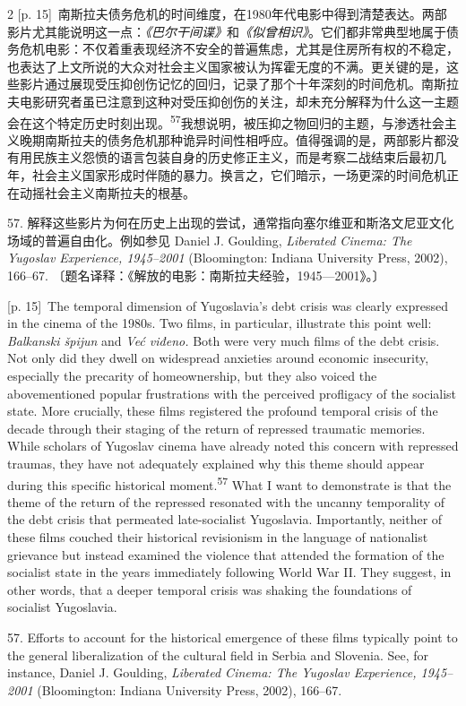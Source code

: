\documentclass[10pt,a4paper]{article}
\begin{document}
\begin{paracol}{2}
{\scriptsize\color{gray} [p. 15]}\ 南斯拉夫债务危机的时间维度，在1980年代电影中得到清楚表达。两部影片尤其能说明这一点：\textit{《巴尔干间谍》}和\textit{《似曾相识》}。它们都非常典型地属于债务危机电影：不仅着重表现经济不安全的普遍焦虑，尤其是住房所有权的不稳定，也表达了上文所说的大众对社会主义国家被认为挥霍无度的不满。更关键的是，这些影片通过展现受压抑创伤记忆的回归，记录了那个十年深刻的时间危机。南斯拉夫电影研究者虽已注意到这种对受压抑创伤的关注，却未充分解释为什么这一主题会在这个特定历史时刻出\mbox{现。\textsuperscript{57}}我想说明，被压抑之物回归的主题，与渗透社会主义晚期南斯拉夫的债务危机那种诡异时间性相呼应。值得强调的是，两部影片都没有用民族主义怨愤的语言包装自身的历史修正主义，而是考察二战结束后最初几年，社会主义国家形成时伴随的暴力。换言之，它们暗示，一场更深的时间危机正在动摇社会主义南斯拉夫的根基。\par{\small 57. 解释这些影片为何在历史上出现的尝试，通常指向塞尔维亚和斯洛文尼亚文化场域的普遍自由化。例如参见 Daniel J. Goulding, \textit{Liberated Cinema: The Yugoslav Experience, 1945–2001} (Bloomington: Indiana University Press, 2002), 166–67. 〔题名译释：《解放的电影：南斯拉夫经验，1945—2001》。〕\par}
\switchcolumn
{\scriptsize\color{gray} [p. 15]}\ The temporal dimension of Yugoslavia’s debt crisis was clearly expressed in the cinema of the 1980s. Two films, in particular, illustrate this point well: \textit{Balkanski špijun} and \textit{Već viđeno.} Both were very much films of the debt crisis. Not only did they dwell on widespread anxieties around economic insecurity, especially the precarity of homeownership, but they also voiced the abovementioned popular frustrations with the perceived profligacy of the socialist state. More crucially, these films registered the profound temporal crisis of the decade through their staging of the return of repressed traumatic memories. While scholars of Yugoslav cinema have already noted this concern with repressed traumas, they have not adequately explained why this theme should appear during this specific historical moment.\nobreak\textsuperscript{57} What I want to demonstrate is that the theme of the return of the repressed resonated with the uncanny temporality of the debt crisis that permeated late-socialist Yugoslavia. Importantly, neither of these films couched their historical revisionism in the language of nationalist grievance but instead examined the violence that attended the formation of the socialist state in the years immediately following World War II. They suggest, in other words, that a deeper temporal crisis was shaking the foundations of socialist Yugoslavia.\par{\small 57. Efforts to account for the historical emergence of these films typically point to the general liberalization of the cultural field in Serbia and Slovenia. See, for instance, Daniel J. Goulding, \textit{Liberated Cinema: The Yugoslav Experience, 1945–2001} (Bloomington: Indiana University Press, 2002), 166–67.\par}

\end{paracol}
\end{document}
